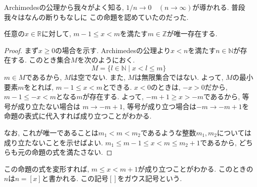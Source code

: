 \documentclass[a4j,dvipdfmx]{jsarticle}
\numberwithin{equation}{section}
\begin{document}
            Archimedesの公理から我々がよく知る, $1/n\rightarrow 0\quad (n\rightarrow\infty)$が導かれる. 普段我々はなんの断りもなしに
            この命題を認めていたのだった.

            \begin{screen}
                任意の$x\in\mathbb{R}$に対して, $m-1\leq x<m$を満たす$m\in\mathbb{Z}$が唯一存在する.
            \end{screen}
            \begin{proof}
                まず$x\geq 0$の場合を示す. Archimedesの公理より$x<n$を満たす$n\in\mathbb{N}$が存在する. このとき集合$M$を次のようにおく.
                \begin{equation*}
                    M=\{l\in\mathbb{N}\mid x<l\leq m\}
                \end{equation*}
                $m\in M$であるから, $M$は空でない. また, $M$は無限集合ではない. よって, $M$の最小要素$m$をとれば, $m-1\leq x<m$とできる.
                $x<0$のときは, $-x>0$だから, $m-1\leq-x<m$となる$m$が存在する. よって, $-m+1\geq x>-m$であるから, 等号が成り立たない場合は
                $m\rightarrow -m+1$, 等号が成り立つ場合は$-m\rightarrow -m+1$を命題の表式に代入すれば成り立つことがわかる. 

                なお, これが唯一であることは$m_1<m<m_2$であるような整数$m_1,m_2$については成り立たないことを示せばよい. 
                $m_1\leq m-1\leq x<m\leq m_2+1$であるから, どちらも元の命題の式を満たさない.
            \end{proof}
            この命題の式を変形すれば, $m\leq x<m+1$が成り立つことがわかる. このときの$n$は$n=[x]$と書かれる. この記号$[]$をガウス記号という. 
\end{document}
